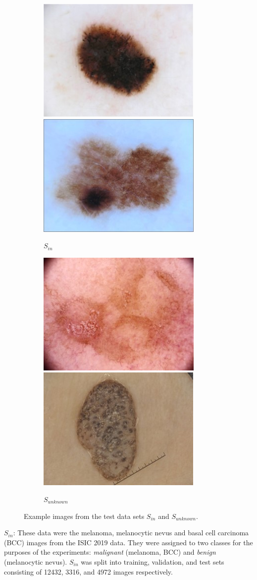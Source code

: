 \begin{figure}[h]
	\centering
	\begin{subfigure}{\textwidth}
		\centering
		\includegraphics[width=0.3\linewidth]{images/MEL.jpg}
		\includegraphics[width=0.3\linewidth]{images/NV.jpg}
		\caption{\(S_{in}\)}
	\end{subfigure}
	\begin{subfigure}{\textwidth}
		\centering
		\includegraphics[width=0.3\linewidth]{images/SCC.jpg}
		\includegraphics[width=0.3\linewidth]{images/BLK.jpg}
		\caption{\(S_{unknown}\)}
	\end{subfigure}
	\caption{Example images from the test data sets \(S_{in}\) and \(S_{unknown}\).}
	\label{fig:isic_dataset_examples}
\end{figure}

\(S_{in}\): These data were the melanoma, melanocytic nevus and basal cell carcinoma (BCC) images from the ISIC 2019 data. They were assigned to two classes for the purposes of the experiments: {\em malignant} (melanoma, BCC) and {\em benign} (melanocytic nevus). \(S_{in}\) was split into training, validation, and test sets consisting of 12432, 3316, and 4972 images respectively. 

